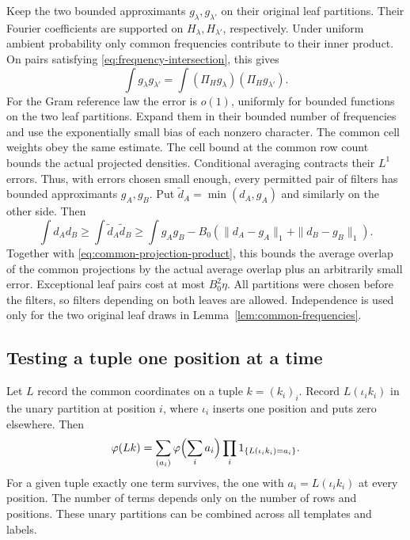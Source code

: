 Keep the two bounded approximants \(g_\lambda,g_{\lambda'}\) on their
original leaf partitions. Their Fourier coefficients are supported on
\(H_\lambda,H_{\lambda'}\), respectively. Under uniform ambient
probability only common frequencies contribute to their inner product.
On pairs satisfying \eqref{eq:frequency-intersection}, this gives
\begin{equation}\label{eq:common-projection-product}
 \int g_\lambda g_{\lambda'}=
 \int(\Pi_Hg_\lambda)(\Pi_Hg_{\lambda'}).
\end{equation}
For the Gram reference law the error is \(o(1)\), uniformly for bounded
functions on the two leaf partitions. Expand them in their bounded
number of frequencies and use the exponentially small bias of each
nonzero character. The common cell weights obey the same estimate.
The cell bound at the common row count bounds the actual projected
densities. Conditional averaging contracts their \(L^1\) errors.
Thus, with errors chosen small enough, every permitted pair of filters has
bounded approximants \(g_A,g_B\). Put \(\widetilde d_A=\min(d_A,g_A)\)
and similarly on the other side. Then
\begin{equation}\label{eq:bounded-overlap-transfer}
 \int d_Ad_B\ge\int\widetilde d_A\widetilde d_B
 \ge\int g_Ag_B-B_0(\|d_A-g_A\|_1+\|d_B-g_B\|_1).
\end{equation}
Together with \eqref{eq:common-projection-product}, this bounds the average
overlap of the common projections by the actual average overlap plus an
arbitrarily small error. Exceptional leaf pairs cost at most \(B_0^2\eta\).
All partitions were chosen before the filters, so filters depending on
both leaves are allowed. Independence is used only for the two original
leaf draws in Lemma~\ref{lem:common-frequencies}.

\subsection{Testing a tuple one position at a time}

Let \(L\) record the common coordinates on a tuple \(k=(k_i)_i\).
Record \(L(\iota_i k_i)\) in the unary partition at position \(i\), where
\(\iota_i\) inserts one position and puts zero elsewhere. Then
\begin{equation}\label{eq:exact-product}
 \varphi(Lk)=\sum_{(a_i)}\varphi\Bigl(\sum_i a_i\Bigr)
                 \prod_i1_{\{L(\iota_i k_i)=a_i\}}.
\end{equation}
For a given tuple exactly one term survives, the one with
\(a_i=L(\iota_i k_i)\) at every position. The number of terms depends
only on the number of rows and positions. These unary partitions
can be combined across all templates and labels.

